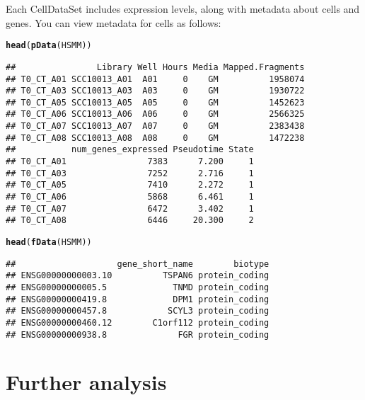 \documentclass[10pt,oneside]{article}\usepackage[]{graphicx}\usepackage[]{color}
\makeatletter
\newcommand{\hlstd}[1]{\textcolor[rgb]{0.345,0.345,0.345}{#1}}%
\newcommand{\hlkwd}[1]{\textcolor[rgb]{0.737,0.353,0.396}{\textbf{#1}}}%
\newenvironment{kframe}{%
 \def\at@end@of@kframe{}%
 \ifinner\ifhmode%
  \def\at@end@of@kframe{\end{minipage}}%
  \begin{minipage}{\columnwidth}%
 \fi\fi%
 \def\FrameCommand##1{\hskip\@totalleftmargin \hskip-\fboxsep
 \colorbox{shadecolor}{##1}\hskip-\fboxsep
     \hskip-\linewidth \hskip-\@totalleftmargin \hskip\columnwidth}%
 \MakeFramed {\advance\hsize-\width
   \@totalleftmargin\z@ \linewidth\hsize
   \@setminipage}}%
 {\par\unskip\endMakeFramed%
 \at@end@of@kframe}
\newenvironment{knitrout}{}{} %
\makeatother
\begin{document}
Each CellDataSet includes expression levels, along with metadata about cells and genes.  You can view metadata for cells as follows:
\begin{knitrout}
\color{fgcolor}\begin{kframe}
\begin{alltt}
\hlkwd{head}\hlstd{(}\hlkwd{pData}\hlstd{(HSMM))}
\end{alltt}
\begin{verbatim}
##                Library Well Hours Media Mapped.Fragments
## T0_CT_A01 SCC10013_A01  A01     0    GM          1958074
## T0_CT_A03 SCC10013_A03  A03     0    GM          1930722
## T0_CT_A05 SCC10013_A05  A05     0    GM          1452623
## T0_CT_A06 SCC10013_A06  A06     0    GM          2566325
## T0_CT_A07 SCC10013_A07  A07     0    GM          2383438
## T0_CT_A08 SCC10013_A08  A08     0    GM          1472238
##           num_genes_expressed Pseudotime State
## T0_CT_A01                7383      7.200     1
## T0_CT_A03                7252      2.716     1
## T0_CT_A05                7410      2.272     1
## T0_CT_A06                5868      6.461     1
## T0_CT_A07                6472      3.402     1
## T0_CT_A08                6446     20.300     2
\end{verbatim}
\end{kframe}
\end{knitrout}



\begin{knitrout}
\color{fgcolor}\begin{kframe}
\begin{alltt}
\hlkwd{head}\hlstd{(}\hlkwd{fData}\hlstd{(HSMM))}
\end{alltt}
\begin{verbatim}
##                    gene_short_name        biotype
## ENSG00000000003.10          TSPAN6 protein_coding
## ENSG00000000005.5             TNMD protein_coding
## ENSG00000000419.8             DPM1 protein_coding
## ENSG00000000457.8            SCYL3 protein_coding
## ENSG00000000460.12        C1orf112 protein_coding
## ENSG00000000938.8              FGR protein_coding
\end{verbatim}
\end{kframe}
\end{knitrout}



\section{Further analysis}
\end{document}
